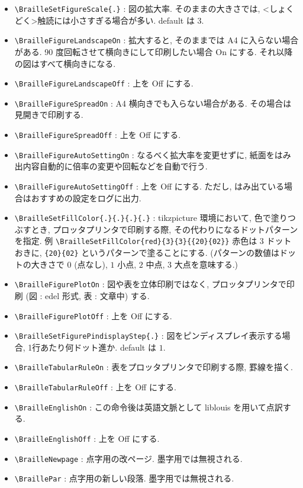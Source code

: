 \documentclass[lualatex,ja=standard,jafont=haranoaji]{bxjsarticle}
\begin{document}
\begin{itemize}

\item \verb|\BrailleSetFigureScale{.}| : 図の拡大率. そのままの大きさでは, \BrailleReading<しょくどく>{触読}には小さすぎる場合が多い. default は $3$.
\item \verb|\BrailleFigureLandscapeOn| : 拡大すると, そのままでは A4 に入らない場合がある. 90 度回転させて横向きにして印刷したい場合 On にする. それ以降の図はすべて横向きになる.
\item \verb|\BrailleFigureLandscapeOff| : 上を Off にする.
\item \verb|\BrailleFigureSpreadOn| : A4 横向きでも入らない場合がある. その場合は見開きで印刷する. 
\item \verb|\BrailleFigureSpreadOff| : 上を Off にする.
\item \verb|\BrailleFigureAutoSettingOn| : なるべく拡大率を変更せずに, 紙面をはみ出内容自動的に倍率の変更や回転などを自動で行う.
\item \verb|\BrailleFigureAutoSettingOff| : 上を Off にする. ただし, はみ出ている場合はおすすめの設定をログに出力.  
\item \verb|\BrailleSetFillColor{.}{.}{.}{.}| : tikzpicture 環境において, 色で塗りつぶすとき, プロッタプリンタで印刷する際, その代わりになるドットパターンを指定. 例 \verb|\BrailleSetFillColor{red}{3}{3}{{20}{02}}| 赤色は 3 ドットおきに, \verb|{20}{02}| というパターンで塗ることにする. (パターンの数値はドットの大きさで $0$ (点なし), $1$ 小点, $2$ 中点, $3$ 大点を意味する.) 
\item \verb|\BrailleFigurePlotOn| : 図や表を立体印刷ではなく, プロッタプリンタで印刷 (図 : edel 形式, 表 : 文章中) する. 
\item \verb|\BrailleFigurePlotOff| : 上を Off にする.
\item \verb|\BrailleSetFigurePindisplayStep{.}| : 図をピンディスプレイ表示する場合, 1行あたり何ドット進か. default は $1$.
\item \verb|\BrailleTabularRuleOn| : 表をプロッタプリンタで印刷する際, 罫線を描く.
\item \verb|\BrailleTabularRuleOff| : 上を Off にする.
\item \verb|\BrailleEnglishOn| : この命令後は英語文脈として liblouis を用いて点訳する.
\item \verb|\BrailleEnglishOff| : 上を Off にする.
\item \verb|\BrailleNewpage| : 点字用の改ページ. 墨字用では無視される.
\item \verb|\BraillePar| : 点字用の新しい段落. 墨字用では無視される.

\end{itemize}
\end{document}
